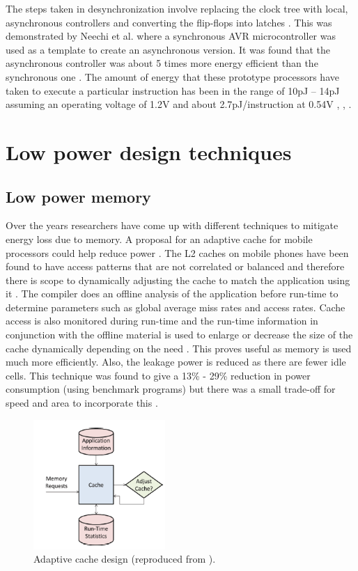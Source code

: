 \documentclass[journal]{IEEEtran}
\begin{document}
The steps taken in desynchronization involve replacing the clock tree with local, asynchronous controllers and converting the flip-flops into latches \cite{AVR}. This was demonstrated by Neechi et al. \cite{AVR} where a synchronous AVR microcontroller was used as a template to create an asynchronous version. It was found that the asynchronous controller was about 5 times more energy efficient than the synchronous one \cite{AVR}. The amount of energy that these prototype processors have taken to execute a particular instruction has been in the range of 10pJ – 14pJ assuming an operating voltage of 1.2V and about 2.7pJ/instruction at 0.54V \cite{SNAP/LE}, \cite{AVR}, \cite{SmartDust}.
	 
\section{Low power design techniques}
\subsection{Low power memory}
Over the years researchers have come up with different techniques to mitigate energy loss due to memory. A proposal for an adaptive cache for mobile processors could help reduce power \cite{Mem-Cache}. The L2 caches on mobile phones have been found to have access patterns that are not correlated or balanced and therefore there is scope to dynamically adjusting the cache to match the application using it \cite{Mem-Cache}. The compiler does an offline analysis of the application before run-time to determine parameters such as global average miss rates and access rates. Cache access is also monitored during run-time and the run-time information in conjunction with the offline material is used to enlarge or decrease the size of the cache dynamically depending on the need \cite{Mem-Cache}. This proves useful as memory is used much more efficiently. Also, the leakage power is reduced as there are fewer idle cells. This technique was found to give a 13\% - 29\% reduction in power consumption (using benchmark programs) but there was a small trade-off for speed and area to incorporate this \cite{Mem-Cache}.\\

	\begin{figure}[h]
	   \centering
	   \includegraphics[width = 5cm]{AdaptiveCache}
	   \caption{Adaptive cache design (reproduced from \cite{Mem-Cache}).}
	   \label{Figure:Mem-Cache}
	\end{figure}	
	\FloatBarrier
\end{document}
